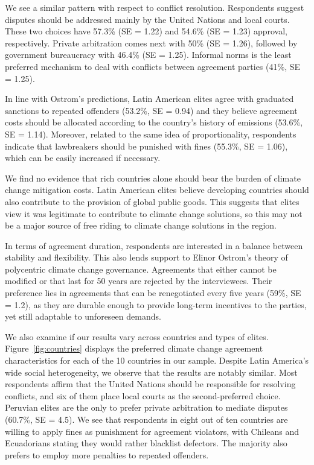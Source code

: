 \documentclass[a4paper,12pt]{article}
\begin{document}
We see a similar pattern with respect to conflict resolution. Respondents suggest disputes should be addressed mainly by the United Nations and local courts. These two choices have 57.3\% (SE = 1.22) and 54.6\% (SE = 1.23) approval, respectively. Private arbitration comes next with 50\% (SE = 1.26), followed by government bureaucracy with 46.4\% (SE = 1.25). Informal norms is the least preferred mechanism to deal with conflicts between agreement parties (41\%, SE = 1.25). 

In line with Ostrom's predictions, Latin American elites agree with graduated sanctions to repeated offenders (53.2\%, SE = 0.94) and they believe agreement costs should be allocated according to the country's history of emissions (53.6\%, SE = 1.14). Moreover, related to the same idea of proportionality, respondents indicate that lawbreakers should be punished with fines (55.3\%, SE = 1.06), which can be easily increased if necessary.

We find no evidence that rich countries alone should bear the burden of climate change mitigation costs. Latin American elites believe developing countries should also contribute to the provision of global public goods. This suggests that elites view it was legitimate to contribute to climate change solutions, so this may not be a major source of free riding to climate change solutions in the region.

In terms of agreement duration, respondents are interested in a balance between stability and flexibility. This also lends support to Elinor Ostrom's theory of polycentric climate change governance. Agreements that either cannot be modified or that last for 50 years are rejected by the interviewees. Their preference lies in agreements that can be renegotiated every five years (59\%, SE = 1.2), as they are durable enough to provide long-term incentives to the parties, yet still adaptable to unforeseen demands.

We also examine if our results vary across countries and types of elites. Figure~\ref{fig:countries} displays the preferred climate change agreement characteristics for each of the 10 countries in our sample. Despite Latin America's wide social heterogeneity, we observe that the results are notably similar. Most respondents affirm that the United Nations should be responsible for resolving conflicts, and six of them place local courts as the second-preferred choice. Peruvian elites are the only to prefer private arbitration to mediate disputes (60.7\%, SE = 4.5). We see that respondents in eight out of ten countries are willing to apply fines as punishment for agreement violators, with Chileans and Ecuadorians stating they would rather blacklist defectors. The majority also prefers to employ more penalties to repeated offenders. 
\end{document}
